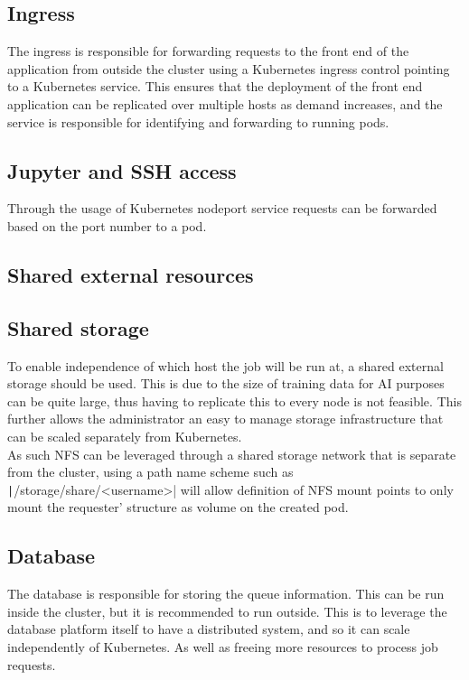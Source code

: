 \documentclass[../main.tex]{subfiles}
\begin{document}
\subsection*{Ingress}
The ingress is responsible for forwarding requests to the front end of the application from outside the cluster using a Kubernetes ingress control pointing to a Kubernetes service. This ensures that the deployment of the front end application can be replicated over multiple hosts as demand increases, and the service is responsible for identifying and forwarding to running pods.

\subsection*{Jupyter and SSH access}
Through the usage of Kubernetes nodeport service requests can be forwarded based on the port number to a pod.


\subsection{Shared external resources}
\subsection*{Shared storage}
To enable independence of which host the job will be run at, a shared external storage should be used. This is due to the size of training data for AI purposes can be quite large, thus having to replicate this to every node is not feasible. This further allows the administrator an easy to manage storage infrastructure that can be scaled separately from Kubernetes.\\
As such NFS can be leveraged through a shared storage network that is separate from the cluster, using a path name scheme such as \texttt|/storage/share/<username>| will allow definition of NFS mount points to only mount the requester' structure as volume on the created pod.


\subsection*{Database}
The database is responsible for storing the queue information. This can be run inside the cluster, but it is recommended to run outside. This is to leverage the database platform itself to have a distributed system, and so it can scale independently of Kubernetes. As well as freeing more resources to process job requests.
\end{document}
